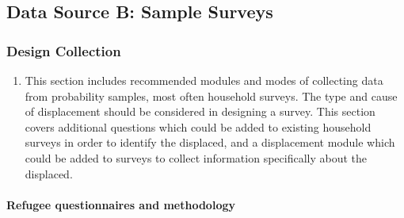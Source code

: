 \documentclass[
]{article}
\providecommand{\tightlist}{%
  \setlength{\itemsep}{0pt}\setlength{\parskip}{0pt}}
\begin{document}
\hypertarget{data-source-b-sample-surveys}{%
\subsection{Data Source B: Sample Surveys}\label{data-source-b-sample-surveys}}

\hypertarget{design-collection-1}{%
\subsubsection{Design Collection}\label{design-collection-1}}

\begin{enumerate}
\def\labelenumi{\arabic{enumi}.}
\setcounter{enumi}{120}
\tightlist
\item
  This section includes recommended modules and modes of collecting
  data from probability samples, most often household surveys. The
  type and cause of displacement should be considered in designing a
  survey. This section covers additional questions which could be
  added to existing household surveys in order to identify the
  displaced, and a displacement module which could be added to surveys
  to collect information specifically about the displaced.
\end{enumerate}

\hypertarget{b.1.-refugee-questionnaires-and-methodology}{%
\paragraph{Refugee questionnaires and methodology}\label{b.1.-refugee-questionnaires-and-methodology}}
\end{document}
